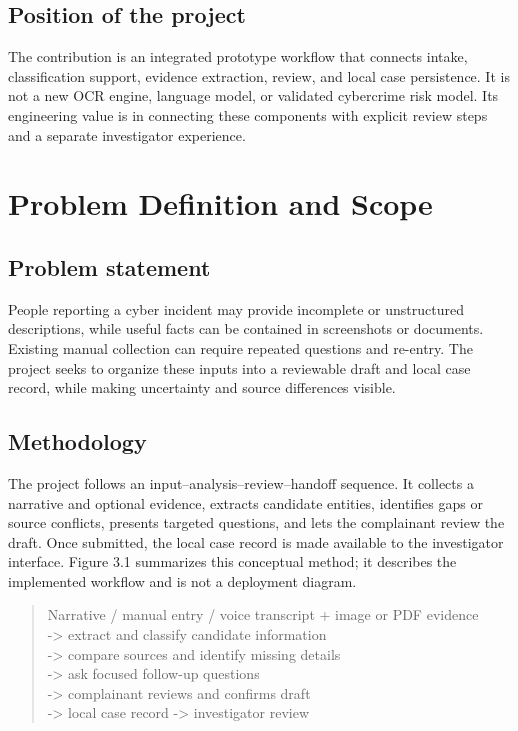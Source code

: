 \documentclass[12pt,a4paper,oneside]{report}
\begin{document}
\section{Position of the project}
The contribution is an integrated prototype workflow that connects intake, classification support, evidence extraction, review, and local case persistence. It is not a new OCR engine, language model, or validated cybercrime risk model. Its engineering value is in connecting these components with explicit review steps and a separate investigator experience.\par\medskip
\clearpage\chapter{Problem Definition and Scope}
\section{Problem statement}
People reporting a cyber incident may provide incomplete or unstructured descriptions, while useful facts can be contained in screenshots or documents. Existing manual collection can require repeated questions and re-entry. The project seeks to organize these inputs into a reviewable draft and local case record, while making uncertainty and source differences visible.\par\medskip
\section{Methodology}
The project follows an input--analysis--review--handoff sequence. It collects a narrative and optional evidence, extracts candidate entities, identifies gaps or source conflicts, presents targeted questions, and lets the complainant review the draft. Once submitted, the local case record is made available to the investigator interface. Figure 3.1 summarizes this conceptual method; it describes the implemented workflow and is not a deployment diagram.\par\medskip
{}
\begin{quote}\ttfamily\footnotesize Narrative / manual entry / voice transcript + image or PDF evidence\\                  -> extract and classify candidate information\\                  -> compare sources and identify missing details\\                  -> ask focused follow-up questions\\                  -> complainant reviews and confirms draft\\                  -> local case record -> investigator review\end{quote}
\end{document}

